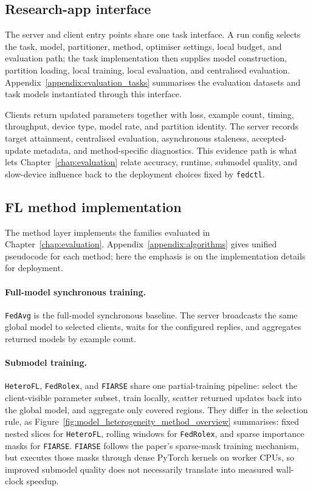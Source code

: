 \subsection[Research-app interface]{Research-app interface }

The server and client entry points share one task interface. A run config selects the task, model, partitioner, method, optimiser settings, local budget, and evaluation path; the task implementation then supplies model construction, partition loading, local training, local evaluation, and centralised evaluation. Appendix~\ref{appendix:evaluation_tasks} summarises the evaluation datasets and task models instantiated through this interface.

Clients return updated parameters together with loss, example count, timing, throughput, device type, model rate, and partition identity. The server records target attainment, centralised evaluation, asynchronous staleness, accepted-update metadata, and method-specific diagnostics. This evidence path is what lets Chapter~\ref{chap:evaluation} relate accuracy, runtime, submodel quality, and slow-device influence back to the deployment choices fixed by \texttt{fedctl}.

\FloatBarrier
\subsection{FL method implementation}

The method layer implements the families evaluated in Chapter~\ref{chap:evaluation}. Appendix~\ref{appendix:algorithms} gives unified pseudocode for each method; here the emphasis is on the implementation details for deployment.

\paragraph{Full-model synchronous training.}
\texttt{FedAvg} is the full-model synchronous baseline. The server broadcasts the same global model to selected clients, waits for the configured replies, and aggregates returned models by example count.

\paragraph{Submodel training.}
\texttt{HeteroFL}, \texttt{FedRolex}, and \texttt{FIARSE} share one partial-training pipeline: select the client-visible parameter subset, train locally, scatter returned updates back into the global model, and aggregate only covered regions. They differ in the selection rule, as Figure~\ref{fig:model_heterogeneity_method_overview} summarises: fixed nested slices for \texttt{HeteroFL}, rolling windows for \texttt{FedRolex}, and sparse importance masks for \texttt{FIARSE}. \texttt{FIARSE} follows the paper's sparse-mask training mechanism, but executes those masks through dense PyTorch kernels on worker CPUs, so improved submodel quality does not necessarily translate into measured wall-clock speedup.

